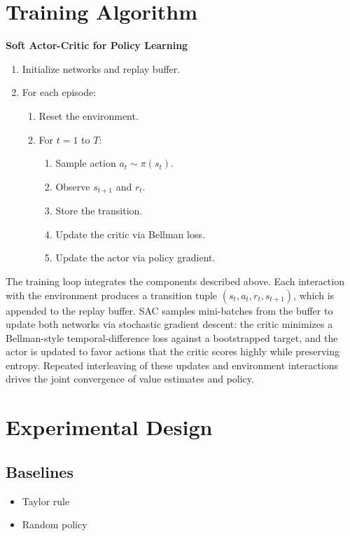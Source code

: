 \documentclass[11pt]{article}
\begin{document}
\section{Training Algorithm}
\noindent\textbf{Soft Actor-Critic for Policy Learning}
\begin{enumerate}
    \item Initialize networks and replay buffer.
    \item For each episode:
    \begin{enumerate}
        \item Reset the environment.
        \item For $t = 1$ to $T$:
        \begin{enumerate}
            \item Sample action $a_t \sim \pi(s_t)$.
            \item Observe $s_{t+1}$ and $r_t$.
            \item Store the transition.
            \item Update the critic via Bellman loss.
            \item Update the actor via policy gradient.
        \end{enumerate}
    \end{enumerate}
\end{enumerate}
The training loop integrates the components described above. Each interaction with the environment produces a transition tuple $(s_t, a_t, r_t, s_{t+1})$, which is appended to the replay buffer. SAC samples mini-batches from the buffer to update both networks via stochastic gradient descent: the critic minimizes a Bellman-style temporal-difference loss against a bootstrapped target, and the actor is updated to favor actions that the critic scores highly while preserving entropy. Repeated interleaving of these updates and environment interactions drives the joint convergence of value estimates and policy.

\section{Experimental Design}

\subsection{Baselines}
\begin{itemize}
    \item Taylor rule
    \item Random policy
\end{itemize}
\end{document}
